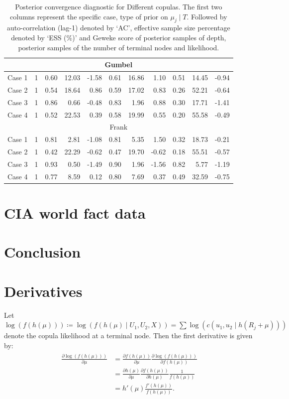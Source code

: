 \documentclass{amsart}
\begin{document}
\begin{table}[ht]
{\begin{tabular}{lc|crr|crr|crr}
			\midrule
			\multicolumn{11}{c}{Gumbel} \\
			\midrule
			Case 1 & 1 & 0.60 & 12.03 & -1.58 & 0.61 & 16.86 & 1.10 & 0.51 & 14.45 & -0.94 \\ 
			Case 2 & 1 & 0.54 & 18.64 & 0.86 & 0.59 & 17.02 & 0.83 & 0.26 & 52.21 & -0.64 \\ 
			Case 3 & 1 & 0.86 & 0.66 & -0.48 & 0.83 & 1.96 & 0.88 & 0.30 & 17.71 & -1.41 \\ 
			Case 4 & 1 & 0.52 & 22.53 & 0.39 & 0.58 & 19.99 & 0.55 & 0.20 & 55.58 & -0.49 \\ 
			\midrule
			\multicolumn{11}{c}{Frank} \\
			\midrule
			Case 1 & 1 & 0.81 & 2.81 & -1.08 & 0.81 & 5.35 & 1.50 & 0.32 & 18.73 & -0.21 \\ 
			Case 2 & 1 & 0.42 & 22.29 & -0.62 & 0.47 & 19.70 & -0.62 & 0.18 & 55.51 & -0.57 \\ 
			Case 3 & 1 & 0.93 & 0.50 & -1.49 & 0.90 & 1.96 & -1.56 & 0.82 & 5.77 & -1.19 \\ 
			Case 4 & 1 & 0.77 & 8.59 & 0.12 & 0.80 & 7.69 & 0.37 & 0.49 & 32.59 & -0.75 \\ 
			\bottomrule
	\end{tabular}
\caption{Posterior convergence diagnostic for Different copulas. The first two columns represent the specific case, type of prior on $\mu_j\mid T$. Followed by auto-correlation (lag-1) denoted by `AC', effective sample size percentage denoted by `ESS (\%)' and Geweke score of posterior samples of depth, posterior samples of the number of terminal nodes and likelihood.}\label{tab:gauss:convergence}}
\end{table}

\section{CIA world fact data}\label{sec:cia}

\section{Conclusion}\label{sec:conc}

\appendix

\section{Derivatives}
Let $\log(f(h(\mu)))\coloneqq \log(f(h(\mu)\mid U_1,U_2,X)) = \sum\log\left(c(u_1,u_2\mid h(R_j+\mu))\right)$ denote the copula likelihood at a terminal node. Then the first derivative is given by:
\begin{align}
	\begin{split}
		\frac{\partial \log(f(h(\mu)))}{\partial \mu} 
		& = \frac{\partial f(h(\mu))}{\partial \mu}\frac{\partial \log(f(h(\mu)))}{\partial f(h(\mu))}\\
		& = \frac{\partial h(\mu)}{\partial \mu}\frac{\partial f(h(\mu))}{\partial h(\mu)}\frac{1}{f(h(\mu))} \\
		& = h'(\mu)\frac{f'(h(\mu))}{f(h(\mu))}.
	\end{split}
\end{align}
\end{document}
